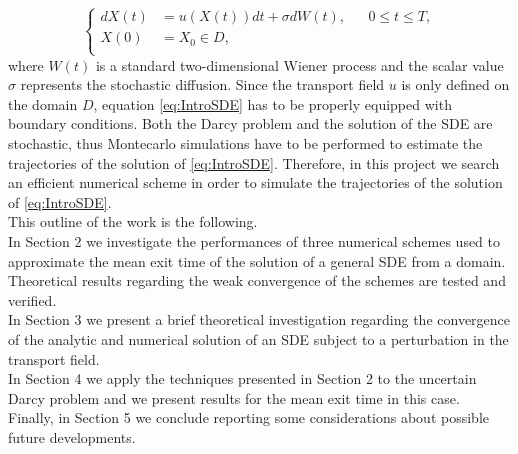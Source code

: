 \begin{equation}
	\label{eq:IntroSDE}
	\left \{
	\begin{aligned}
		dX(t) &= u(X(t)) dt + \sigma dW(t), && 0 \leq t \leq T, \\
		X(0) &= X_0 \in D, \\
	\end{aligned} \right.
\end{equation}
where $W(t)$ is a standard two-dimensional Wiener process and the scalar value $\sigma$ represents the stochastic diffusion. Since the transport field $u$ is only defined on the domain $D$, equation \eqref{eq:IntroSDE} has to be properly equipped with boundary conditions. Both the Darcy problem and the solution of the SDE are stochastic, thus Montecarlo simulations have to be performed to estimate the trajectories of the solution of \eqref{eq:IntroSDE}. Therefore, in this project we search an efficient numerical scheme in order to simulate the trajectories of the solution of \eqref{eq:IntroSDE}. \\

\noindent This outline of the work is the following. \\
In Section 2 we investigate the performances of three numerical schemes used to approximate the mean exit time of the solution of a general SDE from a domain. Theoretical results regarding the weak convergence of the schemes are tested and verified. \\
In Section 3 we present a brief theoretical investigation regarding the convergence of the analytic and numerical solution of an SDE subject to a perturbation in the transport field. \\
In Section 4 we apply the techniques presented in Section 2 to the uncertain Darcy problem and we present results for the mean exit time in this case. \\
Finally, in Section 5 we conclude reporting some considerations about possible future developments.
